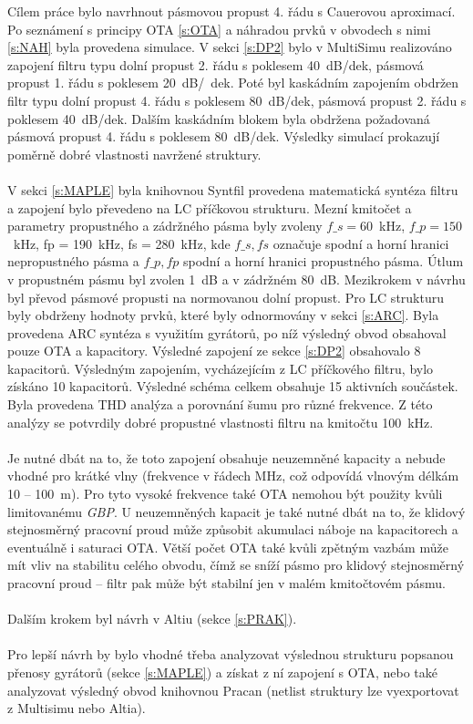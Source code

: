 \noindent Cílem práce bylo navrhnout pásmovou propust 4. řádu s Cauerovou aproximací. Po seznámení s principy OTA \ref{s:OTA} a náhradou prvků v obvodech s nimi \ref{s:NAH} byla provedena simulace. V sekci \ref{s:DP2} bylo v MultiSimu realizováno zapojení filtru typu dolní propust 2. řádu s poklesem 40~dB/dek, pásmová propust 1. řádu s poklesem 20~dB/~dek. Poté byl kaskádním zapojením obdržen filtr typu dolní propust 4. řádu s poklesem 80~dB/dek, pásmová propust 2. řádu s poklesem 40~dB/dek. Dalším kaskádním blokem byla obdržena požadovaná pásmová propust 4. řádu s poklesem 80~dB/dek. Výsledky simulací prokazují poměrně dobré vlastnosti navržené struktury.\\
\\
V sekci \ref{s:MAPLE} byla knihovnou Syntfil provedena matematická syntéza filtru a zapojení bylo převedeno na LC příčkovou strukturu. Mezní kmitočet a parametry propustného a zádržného pásma byly zvoleny $f\_s = 60$~kHz, $f\_p = 150$~kHz, fp = 190~kHz, fs = 280~kHz, kde $f\_s, fs$ označuje spodní a horní hranici nepropustného pásma a $f\_p, fp$ spodní a horní hranici propustného pásma. Útlum v propustném pásmu byl zvolen 1~dB a v zádržném 80~dB. Mezikrokem v návrhu byl převod pásmové propusti na normovanou dolní propust. Pro LC strukturu byly obdrženy hodnoty prvků, které byly odnormovány v sekci \ref{s:ARC}. Byla provedena ARC syntéza s využitím gyrátorů, po níž výsledný obvod obsahoval pouze OTA a kapacitory. Výsledné zapojení ze sekce \ref{s:DP2} obsahovalo 8 kapacitorů. Výsledným zapojením, vycházejícím z LC příčkového filtru, bylo získáno 10 kapacitorů. Výsledné schéma celkem obsahuje 15 aktivních součástek. Byla provedena THD analýza a porovnání šumu pro různé frekvence. Z této analýzy se potvrdily dobré propustné vlastnosti filtru na kmitočtu 100~kHz. \\
\\
Je nutné dbát na to, že toto zapojení obsahuje neuzemněné kapacity a nebude vhodné pro krátké vlny (frekvence v řádech MHz, což odpovídá vlnovým délkám 10 -- 100~m). Pro tyto vysoké frekvence také OTA nemohou být použity kvůli limitovanému \textit{GBP}. U neuzemněných kapacit je také nutné dbát na to, že klidový stejnosměrný pracovní proud může způsobit akumulaci náboje na kapacitorech a eventuálně i saturaci OTA. Větší počet OTA také kvůli zpětným vazbám může mít vliv na stabilitu celého obvodu, čímž se sníží pásmo pro klidový stejnosměrný pracovní proud -- filtr pak může být stabilní jen v malém kmitočtovém pásmu.\\
\\
Dalším krokem byl návrh v Altiu (sekce \ref{s:PRAK}).\\
\\
Pro lepší návrh by bylo vhodné třeba analyzovat výslednou strukturu popsanou přenosy gyrátorů (sekce \ref{s:MAPLE}) a získat z ní zapojení s OTA, nebo také analyzovat výsledný obvod knihovnou Pracan (netlist struktury lze vyexportovat z Multisimu nebo Altia).